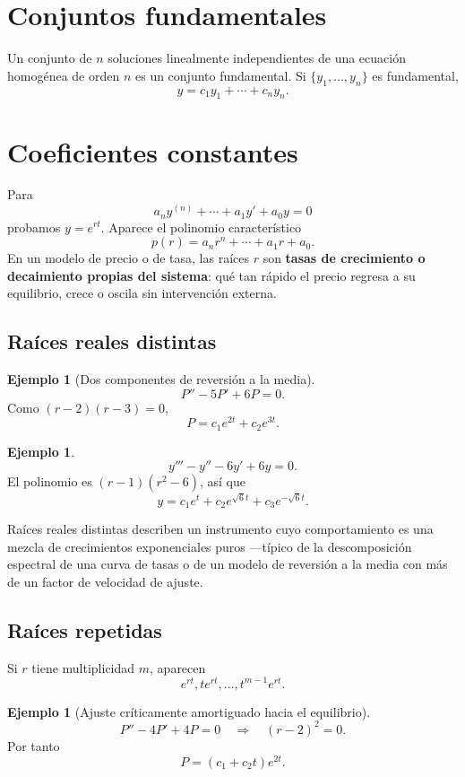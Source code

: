 \documentclass[11pt]{article}
\theoremstyle{definition}
\newtheorem{ejemplo}[teorema]{Ejemplo}
\begin{document}
\section{Conjuntos fundamentales}
Un conjunto de $n$ soluciones linealmente independientes de una ecuación homogénea de
orden $n$ es un conjunto fundamental. Si $\{y_1,\ldots,y_n\}$ es fundamental,
\[
\boxed{y=c_1y_1+\cdots+c_ny_n}.
\]

\section{Coeficientes constantes}
Para
\[
a_ny^{(n)}+\cdots+a_1y'+a_0y=0
\]
probamos $y=e^{rt}$. Aparece el polinomio característico
\[
p(r)=a_nr^n+\cdots+a_1r+a_0.
\]
En un modelo de precio o de tasa, las raíces $r$ son \textbf{tasas de crecimiento o
decaimiento propias del sistema}: qué tan rápido el precio regresa a su equilibrio,
crece o oscila sin intervención externa.

\subsection{Raíces reales distintas}
\begin{ejemplo}[Dos componentes de reversión a la media]
\[
P''-5P'+6P=0.
\]
Como $(r-2)(r-3)=0$,
\[
\boxed{P=c_1e^{2t}+c_2e^{3t}}.
\]
\end{ejemplo}

\begin{ejemplo}
\[
y'''-y''-6y'+6y=0.
\]
El polinomio es $(r-1)(r^2-6)$, así que
\[
\boxed{y=c_1e^t+c_2e^{\sqrt6t}+c_3e^{-\sqrt6t}}.
\]
\end{ejemplo}

\begin{finanzas}
Raíces reales distintas describen un instrumento cuyo comportamiento es una mezcla de
crecimientos exponenciales puros —típico de la descomposición espectral de una curva
de tasas o de un modelo de reversión a la media con más de un factor de velocidad de
ajuste.
\end{finanzas}

\subsection{Raíces repetidas}
Si $r$ tiene multiplicidad $m$, aparecen
\[
e^{rt},te^{rt},\ldots,t^{m-1}e^{rt}.
\]

\begin{ejemplo}[Ajuste críticamente amortiguado hacia el equilibrio]
\[
P''-4P'+4P=0
\quad\Longrightarrow\quad
(r-2)^2=0.
\]
Por tanto
\[
\boxed{P=(c_1+c_2t)e^{2t}}.
\]
\end{ejemplo}
\end{document}

